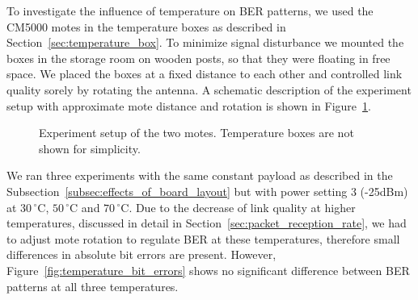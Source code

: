 To investigate the influence of temperature on \ac{BER} patterns, we used the CM5000 motes in the temperature boxes as described in Section~\ref{sec:temperature_box}.
To minimize signal disturbance we mounted the boxes in the storage room on wooden posts, so that they were floating in free space.
We placed the boxes at a fixed distance to each other and controlled link quality sorely by rotating the antenna.
A schematic description of the experiment setup with approximate mote distance and rotation is shown in Figure~\ref{fig:2mote_experiment_setup}.

\begin{figure}[hb]
	\centering
	\caption{Experiment setup of the two motes. Temperature boxes are not shown for simplicity.}
	\label{fig:2mote_experiment_setup}
\end{figure}

We ran three experiments with the same constant payload as described in the Subsection~\ref{subsec:effects_of_board_layout} but with power setting 3 (-25dBm) at $30\,^{\circ}\mathrm{C}$, $50\,^{\circ}\mathrm{C}$ and $70\,^{\circ}\mathrm{C}$.
Due to the decrease of link quality at higher temperatures, discussed in detail in Section~\ref{sec:packet_reception_rate}, we had to adjust mote rotation to regulate \ac{BER} at these temperatures, therefore small differences in absolute bit errors are present.
However, Figure~\ref{fig:temperature_bit_errors} shows no significant difference between \ac{BER} patterns at all three temperatures.

